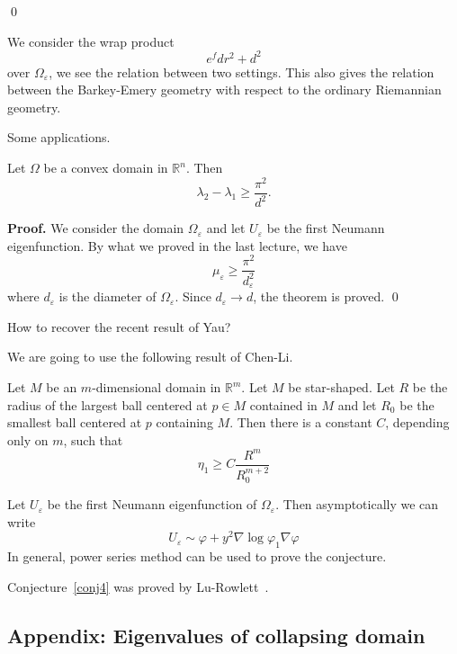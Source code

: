 \qed


\begin{remark}
We consider the wrap product
\[
e^f dr^2 + d^2
\]
over $\Omega_\varepsilon$, we see the relation between two settings. This also
gives the relation between the Barkey-Emery geometry with respect to the
ordinary Riemannian geometry.
\end{remark}

Some applications.
\begin{theorem}
 Let $\Omega$ be a convex domain in $\mathbb{R}^n$. Then
\[
\lambda_2 - \lambda_1 \geqslant \frac{\pi^2}{d^2}.
\]
\end{theorem}
{\bf Proof.}
We consider the domain $\Omega_\varepsilon$ and let $U_\varepsilon$ be the first
Neumann eigenfunction. By what we proved in the last lecture, we have
\[
\mu_\varepsilon \geqslant \frac{\pi^2}{d_\varepsilon^2}
\]
where $d_\varepsilon$ is the diameter of $\Omega_\varepsilon$. Since 
$d_\varepsilon\rightarrow d$, the theorem is proved.
\qed

\begin{question} How to recover the recent result of Yau?
\end{question}

We are going to use
the following result of Chen-Li.

\begin{theorem}
Let $M$ be an $m$-dimensional domain in $\mathbb{R}^m$. Let $M$ be star-shaped.
Let $R$ be the radius of the largest ball centered at $p\in M$ contained in $M$
and let $R_0$ be the smallest ball centered at $p$ containing $M$. Then there is
a constant $C$, depending only on $m$, such that
\[
\eta_1 \geqslant C\frac{R^m}{R_0^{m+2}}
\]
\end{theorem}

Let $U_\varepsilon$ be the first Neumann
eigenfunction of $\Omega_\varepsilon$. Then asymptotically we can write
\[
U_\varepsilon \sim \varphi + y^2 \nabla\log \varphi_1 \nabla\varphi
\]
In general, power series method can be used to prove the conjecture.

\begin{remark} Conjecture~\ref{conj4} was proved by Lu-Rowlett~\cite{lu-rowlett}.
\end{remark}

\subsection*{Appendix: Eigenvalues of collapsing domain}

